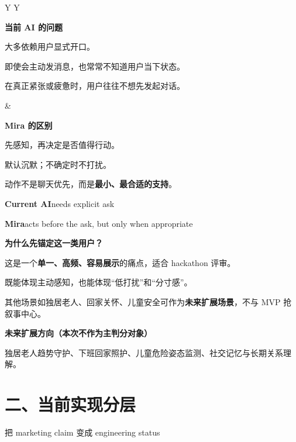\documentclass[11pt,fontset=none]{ctexart}
\newcommand{\PageDivider}{\vspace{0.7em}{\color{MiraMuted}\rule{\linewidth}{0.55pt}}\vspace{0.45em}}
\newcommand{\DeckSub}[1]{{\small\color{MiraGray} #1\par}}
\newcommand{\Metric}[2]{\textbf{#1}\enspace #2\par}
\begin{document}
\vspace{0.55em}
\begin{tabularx}{\linewidth}{Y Y}
\begin{accentbox}
\textbf{当前 AI 的问题}
\begin{tightitemize}
\item 大多依赖用户显式开口。
\item 即使会主动发消息，也常常不知道用户当下状态。
\item 在真正紧张或疲惫时，用户往往不想先发起对话。
\end{tightitemize}
\end{accentbox}
&
\begin{greenbox}
\textbf{Mira 的区别}
\begin{tightitemize}
\item 先感知，再决定是否值得行动。
\item 默认沉默；不确定时不打扰。
\item 动作不是聊天优先，而是\textbf{最小、最合适的支持}。
\end{tightitemize}
\end{greenbox}
\end{tabularx}

\vspace{0.4em}
\Metric{Current AI}{needs explicit ask}
\Metric{Mira}{acts before the ask, but only when appropriate}

\PageDivider

\textbf{为什么先锚定这一类用户？}
\begin{tightitemize}
\item 这是一个\textbf{单一、高频、容易展示}的痛点，适合 hackathon 评审。
\item 既能体现主动感知，也能体现“低打扰”和“分寸感”。
\item 其他场景如独居老人、回家关怀、儿童安全可作为\textbf{未来扩展场景}，不与 MVP 抢叙事中心。
\end{tightitemize}

\begin{bluebox}
\textbf{未来扩展方向（本次不作为主判分对象）}\par
独居老人趋势守护、下班回家照护、儿童危险姿态监测、社交记忆与长期关系理解。
\end{bluebox}

\newpage
\section*{二、当前实现分层}
\DeckSub{把 marketing claim 变成 engineering status}
\end{document}
